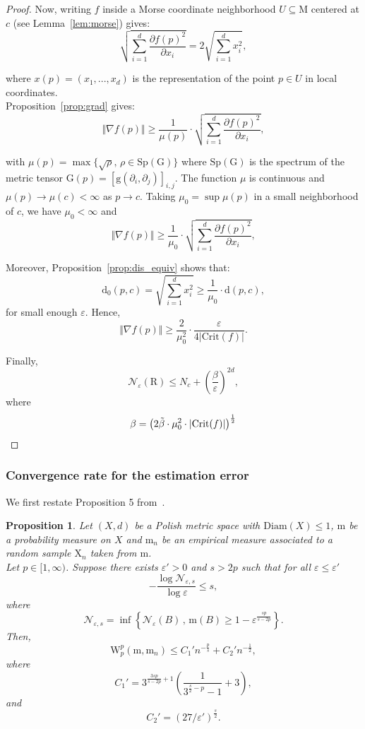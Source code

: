 \documentclass[pdflatex,sn-mathphys-ay]{sn-jnl}%
\newtheorem{proposition}{Proposition}[section]
\newcommand{\spa}{X}
\newcommand{\reeb}{\mathrm{R}}
\newcommand{\man}{\mathrm{M}}
\newcommand{\sample}{\mathrm{X}}
\newcommand{\mes}{\mathrm{m}}
\newcommand{\dis}{\mathrm{d}}
\newcommand{\wasser}{\mathrm{W}}
\newcommand{\critic}{{\mathrm {Crit}}}
\newcommand{\diracn}{\mathrm{m}_n}
\newcommand{\diam}{\mathrm{Diam}}
\newcommand{\covn}{\mathcal{N}}
\newcommand{\g}{\mathrm{g}}
\newcommand{\G}{\mathrm{G}}
\newcommand{\eps}{\varepsilon}
\theoremstyle{thmstyleone}%
\begin{document}
\begin{proof}
 Now, writing $f$ inside a Morse coordinate neighborhood $U\subseteq\man$ centered at $c$ (see Lemma~\ref{lem:morse}) gives:\\
 $$\sqrt{\sum_{i=1}^d\frac{\partial f(p)^2}{\partial x_i}}=2\sqrt{\sum_{i=1}^d x_i^2},$$
 
 where $x(p)=(x_1,...,x_d)$ is the representation of the point $p\in U$ in local coordinates.\\
Proposition~\ref{prop:grad} gives:
$$\Vert \nabla f(p) \Vert\geq \frac{1}{\mu(p)}\cdot \sqrt{\sum_{i=1}^d\frac{\partial f(p)^2}{\partial x_i}},$$

with $\mu(p)=\max\{\sqrt{\rho},\, \rho\in\mathrm{Sp(G)}\}$ where $\mathrm{Sp(G)}$ is the spectrum of the metric tensor $\G(p)=\left[\g(\partial_i,\partial_j)\right]_{i,j}$. The function $\mu$ is continuous and $\mu(p)\rightarrow\mu(c)<\infty$ as $p\rightarrow c$. Taking $\mu_0=\sup \mu(p)$ in a small neighborhood of $c$, we have $\mu_0<\infty$ and 
$$\Vert \nabla f(p) \Vert\geq \frac{1}{\mu_0}\cdot \sqrt{\sum_{i=1}^d\frac{\partial f(p)^2}{\partial x_i}},$$
 
Moreover, Proposition~\ref{prop:dis_equiv} shows that:
$$\dis_0(p,c)=\sqrt{\sum_{i=1}^d x_i^2}\geq \frac{1}{\mu_0} \cdot \dis(p,c),$$
for small enough $\eps$. Hence,
$$\Vert \nabla f(p) \Vert \geq \frac{2}{\mu_0^2}\cdot \frac{\eps}{4\left|\critic(f)\right|}.$$



Finally,
$$\covn_\eps(\reeb)\leq N_c+\left(\frac{\beta}{\eps}\right)^{2d},$$
where 
$$\beta=\left(2\Tilde{\beta}\cdot \mu_0^2\cdot\left|\critic(f)\right| \right)^{\frac{1}{2}}$$

 \end{proof}
 
\subsubsection{Convergence rate for the estimation error} 
We first restate Proposition 5 from~\citet{weed2019sharp}.
\begin{proposition}\label{prop:weed}
Let $(\spa,d)$ be a Polish metric space with $\diam(\spa)\leq 1$, $\mes$ be a probability measure on $\spa$ and $\diracn$ be an empirical measure associated to a random sample $\sample_n$ taken from $\mes$. \\
Let $p\in[1,\infty)$. Suppose there exists $\eps'>0$ and $s>2p$ such that for all $\eps\leq\eps'$
$$-\frac{\log \covn_{\eps,s}}{\log\eps}\leq s,$$
 where $$\covn_{\eps,s}=\inf\left\{\covn_\eps(B)\, ,\,\mes(B)\geq 1-\eps^{\frac{sp}{s-2p}}\right\}.$$
 Then,
 $$\wasser_p^p(\mes,\diracn)\leq C_1'n^{-\frac{p}{s}}+C_2'n^{-\frac{1}{2}},$$
 where 
 $$C_1'=3^{\frac{3sp}{s-2p}+1}\left(\frac{1}{3^{\frac{s}{2}-p}-1}+3\right),$$
 and
 $$C_2'=\left(27/\eps'\right)^{\frac{s}{2}}.$$

\end{proposition}
\end{document}
